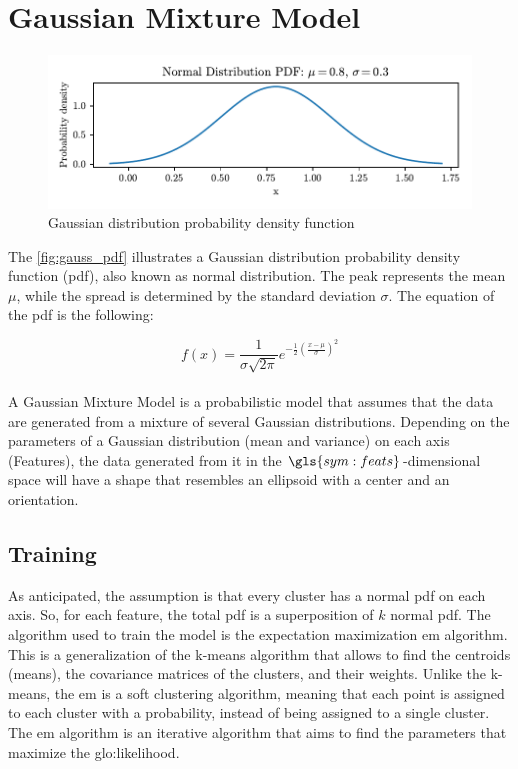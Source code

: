 \section{Gaussian Mixture Model}
\label{sec:gaussian}

\begin{figure}
    \centering
    \includegraphics{images/Gaussian/Figure_3.pdf}
    \caption{Gaussian distribution probability density function}
    \label{fig:gauss_pdf}
\end{figure}

The \autoref{fig:gauss_pdf} illustrates a Gaussian distribution probability density function (\gls{pdf}), also known as normal distribution. The peak represents the mean $\mu$, while the spread is determined by the standard deviation $\sigma$. The equation of the \gls{pdf} is the following:

$$
f(x) = \frac{1}{\sigma \sqrt{2\pi} } e^{-\frac{1}{2}\left(\frac{x-\mu}{\sigma}\right)^2}
$$

\paragraph*{}
A Gaussian Mixture Model is a probabilistic model that assumes that the data are generated from a mixture of several Gaussian distributions. Depending on the parameters of a Gaussian distribution (mean and variance) on each axis (Features), the data generated from it in the $\gls{sym:feats}$-dimensional space will have a shape that resembles an ellipsoid with a center and an orientation.


\subsection{Training}
\label{sec:gauss_train}
As anticipated, the assumption is that every cluster has a normal \gls{pdf} on each axis. So, for each feature, the total \gls{pdf} is a superposition of $k$ normal \gls{pdf}. 
The algorithm used to train the model is the expectation maximization \gls{em} algorithm. This is a generalization of the k-means algorithm that allows to find the centroids (means), the covariance matrices of the clusters, and their weights. Unlike the k-means, the \gls{em} is a soft clustering algorithm, meaning that each point is assigned to each cluster with a probability, instead of being assigned to a single cluster.
The \gls{em} algorithm is an iterative algorithm that aims to find the parameters that maximize the \gls{glo:likelihood}.

